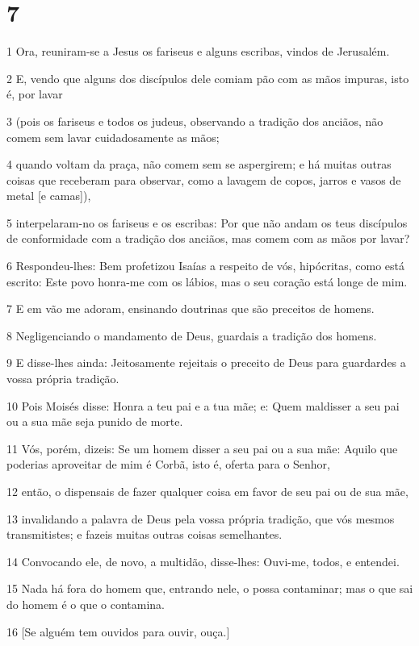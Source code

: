 \chapter{7}

\par 1 Ora, reuniram-se a Jesus os fariseus e alguns escribas, vindos de Jerusalém.
\par 2 E, vendo que alguns dos discípulos dele comiam pão com as mãos impuras, isto é, por lavar
\par 3 (pois os fariseus e todos os judeus, observando a tradição dos anciãos, não comem sem lavar cuidadosamente as mãos;
\par 4 quando voltam da praça, não comem sem se aspergirem; e há muitas outras coisas que receberam para observar, como a lavagem de copos, jarros e vasos de metal [e camas]),
\par 5 interpelaram-no os fariseus e os escribas: Por que não andam os teus discípulos de conformidade com a tradição dos anciãos, mas comem com as mãos por lavar?
\par 6 Respondeu-lhes: Bem profetizou Isaías a respeito de vós, hipócritas, como está escrito: Este povo honra-me com os lábios, mas o seu coração está longe de mim.
\par 7 E em vão me adoram, ensinando doutrinas que são preceitos de homens.
\par 8 Negligenciando o mandamento de Deus, guardais a tradição dos homens.
\par 9 E disse-lhes ainda: Jeitosamente rejeitais o preceito de Deus para guardardes a vossa própria tradição.
\par 10 Pois Moisés disse: Honra a teu pai e a tua mãe; e: Quem maldisser a seu pai ou a sua mãe seja punido de morte.
\par 11 Vós, porém, dizeis: Se um homem disser a seu pai ou a sua mãe: Aquilo que poderias aproveitar de mim é Corbã, isto é, oferta para o Senhor,
\par 12 então, o dispensais de fazer qualquer coisa em favor de seu pai ou de sua mãe,
\par 13 invalidando a palavra de Deus pela vossa própria tradição, que vós mesmos transmitistes; e fazeis muitas outras coisas semelhantes.
\par 14 Convocando ele, de novo, a multidão, disse-lhes: Ouvi-me, todos, e entendei.
\par 15 Nada há fora do homem que, entrando nele, o possa contaminar; mas o que sai do homem é o que o contamina.
\par 16 [Se alguém tem ouvidos para ouvir, ouça.]
